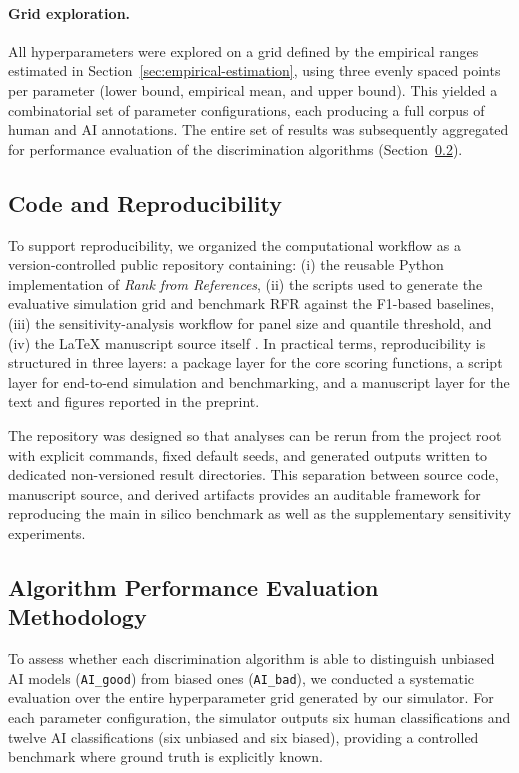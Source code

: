\documentclass[12pt]{article}
\begin{document}
\paragraph{Grid exploration.}
All hyperparameters were explored on a grid defined by the empirical ranges
estimated in Section~\ref{sec:empirical-estimation}, using three evenly spaced
points per parameter (lower bound, empirical mean, and upper bound). This yielded a
combinatorial set of parameter configurations, each producing a full corpus of
human and AI annotations. The entire set of results was subsequently aggregated
for performance evaluation of the discrimination algorithms (Section~\ref{sec:algorithms-eval}).

\subsection{Code and Reproducibility}
\label{sec:code-reproducibility}

To support reproducibility, we organized the computational workflow as a version-controlled public repository containing: (i) the reusable Python implementation of \textit{Rank from References}, (ii) the scripts used to generate the evaluative simulation grid and benchmark RFR against the F1-based baselines, (iii) the sensitivity-analysis workflow for panel size and quantile threshold, and (iv) the \LaTeX{} manuscript source itself \cite{rfrgithub}. In practical terms, reproducibility is structured in three layers: a package layer for the core scoring functions, a script layer for end-to-end simulation and benchmarking, and a manuscript layer for the text and figures reported in the preprint.

The repository was designed so that analyses can be rerun from the project root with explicit commands, fixed default seeds, and generated outputs written to dedicated non-versioned result directories. This separation between source code, manuscript source, and derived artifacts provides an auditable framework for reproducing the main in silico benchmark as well as the supplementary sensitivity experiments.

\subsection{Algorithm Performance Evaluation Methodology}
\label{sec:algorithms-eval}

To assess whether each discrimination algorithm is able to distinguish unbiased AI models
(\texttt{AI\_good}) from biased ones (\texttt{AI\_bad}), we conducted a systematic evaluation
over the entire hyperparameter grid generated by our simulator.
For each parameter configuration, the simulator outputs six human classifications and
twelve AI classifications (six unbiased and six biased), providing a controlled benchmark
where ground truth is explicitly known.
\end{document}
